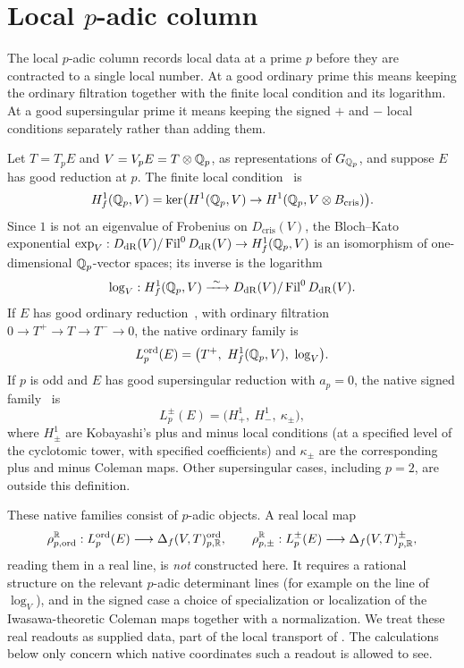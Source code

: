 \section{Local \texorpdfstring{$p$}{p}-adic column}
\label{sec:p-adic}

The local $p$-adic column records local data at a prime $p$ before they
are contracted to a single local number.  At a good ordinary prime this
means keeping the ordinary filtration together with the finite local
condition and its logarithm.  At a good supersingular prime it means
keeping the signed $+$ and $-$ local conditions separately rather than
adding them.

\begin{definition}\label{def:apparatus:p-adic-map}
Let $T=T_pE$ and $V=V_pE=T\otimes\mathbb{Q}_p$, as representations of $G_{\mathbb{Q}_p}$,
and suppose $E$ has good reduction at $p$.  The finite local
condition~\citep{BlochKato1990,Fontaine1994} is
\[
  H^1_f(\mathbb{Q}_p,V)
  =
  \ker\bigl(H^1(\mathbb{Q}_p,V)\to H^1(\mathbb{Q}_p,V\otimes B_{\mathrm{cris}})\bigr).
\]
Since $1$ is not an eigenvalue of Frobenius on $D_{\mathrm{cris}}(V)$, the
Bloch--Kato exponential
$\exp_V:D_{\mathrm{dR}}(V)/\operatorname{Fil}^0D_{\mathrm{dR}}(V)\to H^1_f(\mathbb{Q}_p,V)$
is an isomorphism of one-dimensional $\mathbb{Q}_p$-vector spaces; its inverse is
the logarithm
\[
  \log_V:\Hf(\Qp,V)\xrightarrow{\ \sim\ }
  D_{\mathrm{dR}}(V)/\operatorname{Fil}^0D_{\mathrm{dR}}(V).
\]
If $E$ has good ordinary reduction~\citep{Mazur1972}, with ordinary
filtration $0\to T^+\to T\to T^-\to0$, the native ordinary family is
\[
  L_p^{\mathrm{ord}}(E)=\bigl(T^+,\ \Hf(\Qp,V),\ \log_V\bigr).
\]
If $p$ is odd and $E$ has good supersingular reduction with $a_p=0$, the
native signed family~\citep{Kobayashi2003,Pollack2003} is
\[
  L_p^{\pm}(E)=\bigl(H^1_+,\ H^1_-,\ \kappa_\pm\bigr),
\]
where $H^1_\pm$ are Kobayashi's plus and minus local conditions (at a
specified level of the cyclotomic tower, with specified coefficients) and
$\kappa_\pm$ are the corresponding plus and minus Coleman maps.  Other
supersingular cases, including $p=2$, are outside this definition.

These native families consist of $p$-adic objects.  A real local map
\[
  \rho_{p,\mathrm{ord}}^{\mathbb{R}}:L_p^{\mathrm{ord}}(E)\longrightarrow
  \Delta_f(V,T)_{p,\mathbb{R}}^{\mathrm{ord}},
  \qquad
  \rho_{p,\pm}^{\mathbb{R}}:L_p^{\pm}(E)\longrightarrow
  \Delta_f(V,T)_{p,\mathbb{R}}^{\pm},
\]
reading them in a real line, is \emph{not} constructed here.  It requires
a rational structure on the relevant $p$-adic determinant lines (for
example on the line of $\log_V$), and in the signed case a choice of
specialization or localization of the Iwasawa-theoretic Coleman maps
together with a normalization.  We treat these real readouts as supplied
data, part of the local transport of .
The calculations below only concern which native coordinates such a
readout is allowed to see.
\end{definition}

